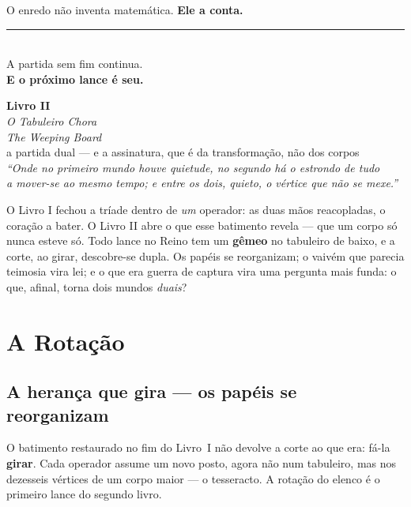 \documentclass[livro.tex]{subfiles}
\begin{document}
O enredo não inventa matemática. \textbf{Ele a conta.}

\vspace{1.2cm}
\begin{center}
\rule{0.3\linewidth}{0.4pt}\\[6mm]
{\large A partida sem fim continua.}\\[3mm]
{\large\bfseries E o próximo lance é seu.}
\end{center}


\clearpage
\thispagestyle{empty}
\vspace*{3.5cm}
\begin{center}
{\Huge\bfseries Livro II}\\[5mm]
{\LARGE\itshape O Tabuleiro Chora}\\[3mm]
{\normalsize\itshape The Weeping Board}\\[10mm]
{\large a partida dual --- e a assinatura, que é da transformação, não dos corpos}\\[14mm]
\itshape ``Onde no primeiro mundo houve quietude, no segundo há o estrondo de tudo\\[1mm]
a mover-se ao mesmo tempo; e entre os dois, quieto, o vértice que não se mexe.''
\end{center}
\clearpage
\setcounter{chapter}{0}

\noindent O Livro I fechou a tríade dentro de \emph{um} operador: as duas mãos
reacopladas, o coração a bater. O Livro II abre o que esse batimento revela ---
que um corpo só nunca esteve só. Todo lance no Reino tem um \textbf{gêmeo} no
tabuleiro de baixo, e a corte, ao girar, descobre-se dupla. Os papéis se
reorganizam; o vaivém que parecia teimosia vira lei; e o que era guerra de captura
vira uma pergunta mais funda: o que, afinal, torna dois mundos \emph{duais}?

\part{A Rotação}

\chapter{A herança que gira --- os papéis se reorganizam}
O batimento restaurado no fim do Livro~I não devolve a corte ao que era: fá-la
\textbf{girar}. Cada operador assume um novo posto, agora não num tabuleiro, mas
nos dezesseis vértices de um corpo maior --- o tesseracto. A rotação do elenco é o
primeiro lance do segundo livro.
\end{document}
